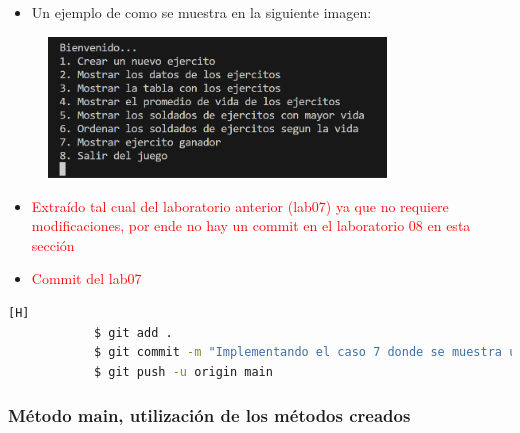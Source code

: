 \documentclass{article}
\begin{document}
        \begin{itemize}
            \begin{itemize}
                \item Un ejemplo de como se muestra en la siguiente imagen:
            \end{itemize}
        \end{itemize}
        
        \begin{figure}[H]
            \centering
            \includegraphics[width=0.8\textwidth,keepaspectratio]{img/mainInterfaz.png}
            \caption{}
        \end{figure}

        \begin{itemize}
            \item \textcolor{red}{Extraído tal cual del laboratorio anterior (lab07) ya que no requiere modificaciones, por ende no hay un commit en el laboratorio 08 en esta sección}
            
            \item \textcolor{red}{Commit del lab07}
        \end{itemize}
        
        \begin{lstlisting}[language=bash,caption={Commit \href{https://github.com/hernanchoquehuanca/fp2-23b/commit/170f535a54c97bdb0ce65ff868320be5f5546e35}{170f535}: Se concluyó el switch dentro del método mainInterfaz tomando en cuenta todos los casos (ÚLTIMO COMMIT)}][H]
    		$ git add .
    		$ git commit -m "Implementando el caso 7 donde se muestra un ejercito ganador o empate, ya teniendo en cuenta la suma de vida de los soldados, esot dentro de la funcion mainInterfaz"	
    		$ git push -u origin main
    	\end{lstlisting}
\newpage
        \subsubsection{Método main, utilización de los métodos creados}
        
\end{document}
